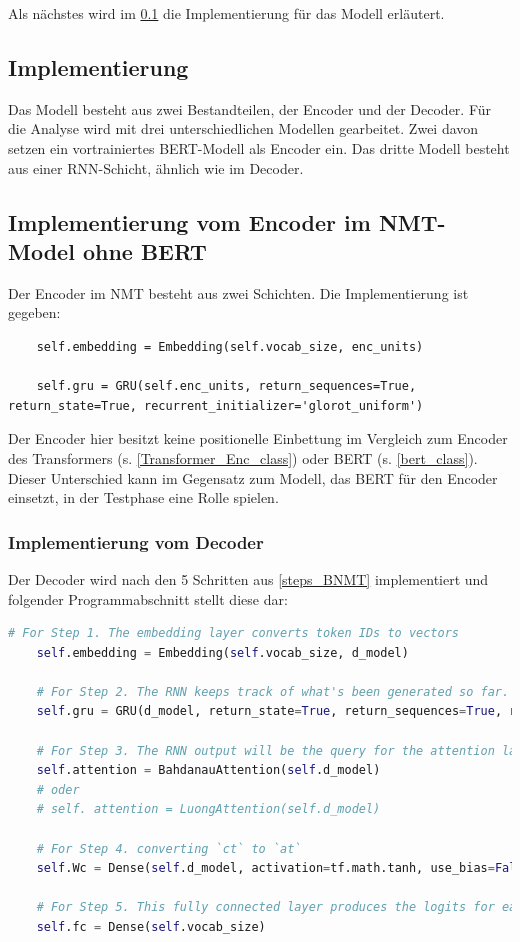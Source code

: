 Als nächstes wird im \cref{BSLM_imp} die Implementierung für das Modell erläutert.

\subsection{Implementierung} \label{BSLM_imp}
Das Modell besteht aus zwei Bestandteilen, der Encoder und der Decoder. Für die Analyse wird mit drei unterschiedlichen Modellen gearbeitet. Zwei davon setzen ein vortrainiertes BERT-Modell als Encoder ein. Das dritte Modell besteht aus einer RNN-Schicht, ähnlich wie im Decoder.

\subsection{Implementierung vom Encoder im NMT-Model ohne BERT}
Der Encoder im NMT besteht aus zwei Schichten. Die Implementierung ist gegeben:
\begin{lstlisting}
	self.embedding = Embedding(self.vocab_size, enc_units)
	
	self.gru = GRU(self.enc_units, return_sequences=True, return_state=True, recurrent_initializer='glorot_uniform')
\end{lstlisting}

Der Encoder hier besitzt keine positionelle Einbettung im Vergleich zum Encoder des Transformers (s. \cref{Transformer_Enc_class}) oder BERT (s. \ref{bert_class}). Dieser Unterschied kann im Gegensatz zum Modell, das BERT für den Encoder einsetzt, in der Testphase eine Rolle spielen.


\subsubsection{Implementierung vom Decoder}
Der Decoder wird nach den 5 Schritten aus \ref{steps_BNMT} implementiert und folgender Programmabschnitt stellt diese dar:
\begin{lstlisting}[language=Python, caption={NMT-Decoder}, label={BNMT_Decoder}]
	# For Step 1. The embedding layer converts token IDs to vectors
	self.embedding = Embedding(self.vocab_size, d_model)
	
	# For Step 2. The RNN keeps track of what's been generated so far.
	self.gru = GRU(d_model, return_state=True, return_sequences=True, recurrent_initializer='glorot_uniform')
	
	# For Step 3. The RNN output will be the query for the attention layer
	self.attention = BahdanauAttention(self.d_model)
	# oder 
	# self. attention = LuongAttention(self.d_model)
	
	# For Step 4. converting `ct` to `at`
	self.Wc = Dense(self.d_model, activation=tf.math.tanh, use_bias=False)
	
	# For Step 5. This fully connected layer produces the logits for each output token
	self.fc = Dense(self.vocab_size)
\end{lstlisting}

